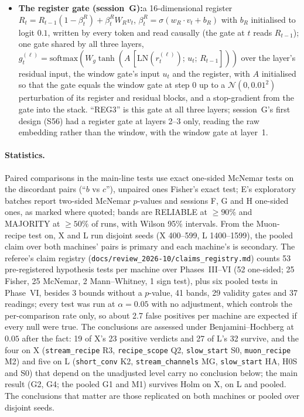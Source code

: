\documentclass[11pt]{article}
\begin{document}
\begin{itemize}
\item \textbf{The register gate (session~G):}\sloppy a 16-dimensional register $R_t = R_{t-1}(1 - \beta^R_t) + \beta^R_t W_R v_t$, $\beta^R_t = \sigma(w_R \cdot v_t + b_R)$ with $b_R$ initialised to logit $0.1$, written by every token and read causally (the gate at $t$ reads $R_{t-1}$); one gate shared by all three layers, $g^{(\ell)}_t = \mathrm{softmax}(W_g \tanh(A\,[\mathrm{LN}(r^{(\ell)}_t);\, u_t;\, R_{t-1}]))$ over the layer's residual input, the window gate's input $u_t$ and the register, with $A$ initialised so that the gate equals the window gate at step 0 up to a $\mathcal{N}(0, 0.01^2)$ perturbation of its register and residual blocks, and a stop-gradient from the gate into the stack. ``REG3'' is this gate at all three layers; session~G's first design (S56) had a register gate at layers 2--3 only, reading the raw embedding rather than the window, with the window gate at layer~1.
\end{itemize}

\paragraph{Statistics.} Paired comparisons in the main-line tests use exact one-sided McNemar tests on the discordant pairs (``$b$ vs $c$''), unpaired ones Fisher's exact test; E's exploratory batches report two-sided McNemar $p$-values and sessions F, G and H one-sided ones, as marked where quoted; bands are RELIABLE at $\geq 90\%$ and MAJORITY at $\geq 50\%$ of runs, with Wilson 95\% intervals. From the Muon-recipe test on, X and L run disjoint seeds (X 400--599, L 1400--1599), the pooled claim over both machines' pairs is primary and each machine's is secondary. The referee's claim registry (\texttt{docs/review\_2026-10/claims\_registry.md}) counts 53 pre-registered hypothesis tests per machine over Phases~III--VI (52 one-sided; 25 Fisher, 25 McNemar, 2 Mann--Whitney, 1 sign test), plus six pooled tests in Phase~VI, besides 3 bounds without a $p$-value, 41 bands, 29 validity gates and 37 readings; every test was run at $\alpha = 0.05$ with no adjustment, which controls the per-comparison rate only, so about 2.7 false positives per machine are expected if every null were true. The conclusions are assessed under Benjamini--Hochberg at $0.05$ after the fact: 19 of X's 23 positive verdicts and 27 of L's 32 survive, and the four on X (\texttt{stream\_recipe} R3, \texttt{recipe\_scope} Q2, \texttt{slow\_start} S0, \texttt{muon\_recipe} M2) and five on L (\texttt{short\_conv} K2, \texttt{stream\_channels} MG, \texttt{slow\_start} HA, H0S and S0) that depend on the unadjusted level carry no conclusion below; the main result (G2, G4; the pooled G1 and M1) survives Holm on X, on L and pooled. The conclusions that matter are those replicated on both machines or pooled over disjoint seeds.
\end{document}
